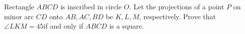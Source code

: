Rectangle $ABCD$ is inscribed in circle $O$. Let the projections of a point $P$ on minor arc $CD$ onto $AB,AC,BD$ be $K,L,M$, respectively. Prove that $\angle LKM=45$if and only if $ABCD$ is a square.